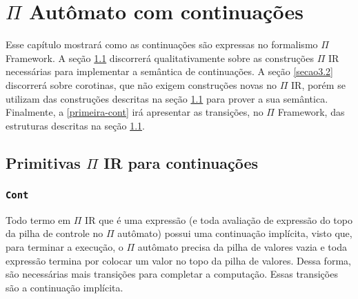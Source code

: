 
\chapter{$\Pi$ Autômato com continuações}
Esse capítulo mostrará como as continuações são expressas no formalismo $\Pi$ Framework.
A seção \ref{secao3.1} discorrerá qualitativamente sobre as construções $\Pi$ IR necessárias para implementar a semântica de continuações. A seção \ref{secao3.2} discorrerá sobre corotinas, que não exigem construções novas no $\Pi$ IR, porém se utilizam das construções descritas na seção \ref{secao3.1} para prover a sua semântica. Finalmente, a \ref{primeira-cont} irá apresentar as transições, no $\Pi$ Framework, das estruturas descritas na seção \ref{secao3.1}.

\section{Primitivas $\Pi$ IR para continuações}\label{secao3.1}

\subsection{\texttt{Cont}}

Todo termo em $\Pi$ IR que é uma expressão (e toda avaliação de expressão do topo da pilha de controle no $\Pi$ autômato) possui uma continuação implícita, visto que, para terminar a execução, o $\Pi$ autômato precisa da pilha de valores vazia e toda expressão termina por colocar um valor no topo da pilha de valores. Dessa forma, são necessárias mais transições para completar a computação. Essas transições são a continuação implícita. 

